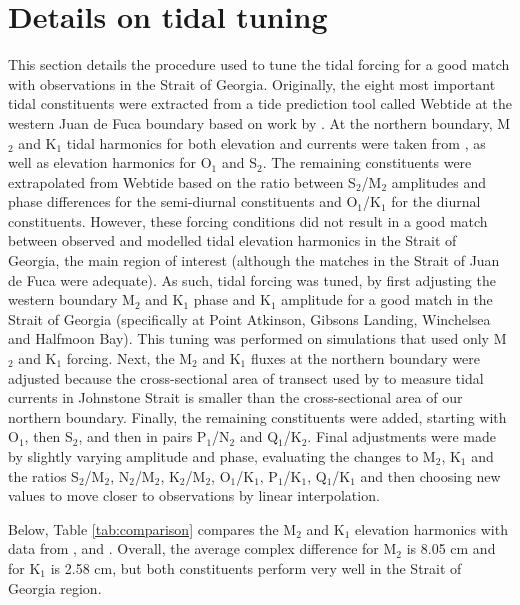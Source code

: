 \documentclass{tATO2e}
\begin{document}



\appendices
\section{Details on tidal tuning}\label{sec:appendix}
This section details the procedure used to tune the tidal forcing for a good match with observations in the Strait of Georgia. Originally, the eight most important tidal constituents were extracted from a tide prediction tool called Webtide \citep{webtide} at the western Juan de Fuca boundary based on work by \citet{foreman2000webtide}. At the northern boundary,  M$_2$ and K$_1$ tidal harmonics for both elevation and currents were taken from \citet{thomson1980johnstone}, as well as elevation harmonics for O$_1$ and S$_2$. The remaining constituents were extrapolated from Webtide based on the ratio between S$_2$/M$_2$ amplitudes and phase differences for the semi-diurnal constituents and O$_1$/K$_1$ for the diurnal constituents. However, these forcing conditions did not result in a good match between observed and modelled tidal elevation harmonics in the Strait of Georgia, the main region of interest (although the matches in the Strait of Juan de Fuca were adequate). As such, tidal forcing was tuned, by first adjusting the western boundary M$_2$ and K$_1$ phase and K$_1$ amplitude for a good match in the Strait of Georgia (specifically at Point Atkinson, Gibsons Landing, Winchelsea and Halfmoon Bay). This tuning was performed on simulations that used only M$_2$ and K$_1$ forcing. Next, the M$_2$ and K$_1$ fluxes at the northern boundary were adjusted because the cross-sectional area of transect used by \citet{thomson1980johnstone} to measure tidal currents in Johnstone Strait is smaller than the cross-sectional area of our northern boundary. Finally, the remaining constituents were added, starting with O$_1$, then S$_2$, and then in pairs P$_1$/N$_2$ and Q$_1$/K$_2$. Final adjustments were made by slightly varying amplitude and phase, evaluating the changes to M$_2$, K$_1$ and the ratios S$_2$/M$_2$, N$_2$/M$_2$, K$_2$/M$_2$, O$_1$/K$_1$, P$_1$/K$_1$, Q$_1$/K$_1$ and then choosing new values to move closer to observations by linear interpolation. 

Below, Table \ref{tab:comparison} compares the M$_2$ and K$_1$ elevation harmonics with data from \citet{foreman1995tidal}, \citet{foreman2004m} and \citet{foreman2012circulation}. Overall, the average complex difference for M$_2$ is 8.05 cm and for K$_1$ is 2.58 cm, but both constituents perform very well in the Strait of Georgia region. 
\end{document}
